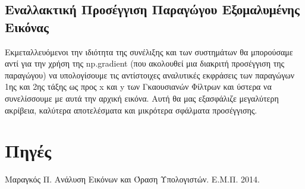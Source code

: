 \documentclass[12pt,a4paper]{article}
\begin{document}
\subsection*{Εναλλακτική Προσέγγιση Παραγώγου Εξομαλυμένης Εικόνας}
\hspace{0.6cm}Εκμεταλλευόμενοι την ιδιότητα της συνέλιξης και των συστημάτων θα μπορούσαμε αντί για την χρήση της \foreignlanguage{english}{np.gradient} (που ακολουθεί μια διακριτή προσέγγιση της παραγώγου) να υπολογίσουμε τις αντίστοιχες αναλυτικές εκφράσεις των παραγώγων 1ης και 2ης τάξης ως προς \foreignlanguage{english}{x} και \foreignlanguage{english}{y} των Γκαουσιανών Φίλτρων και ύστερα να συνελίσσουμε με αυτά την αρχική εικόνα. Αυτή θα μας εξασφάλιζε μεγαλύτερη ακρίβεια, καλύτερα αποτελέσματα και μικρότερα σφάλματα προσέγγισης.

\section*{Πηγές}
Μαραγκός Π. Ανάλυση Εικόνων και Όραση Υπολογιστών. Ε.Μ.Π. 2014.
\end{document}
